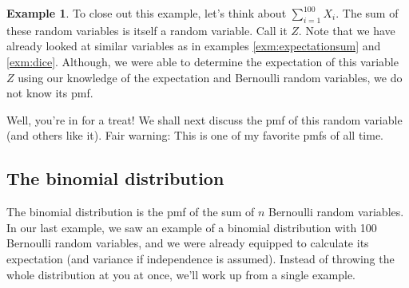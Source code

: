 \documentclass[
]{book}
\theoremstyle{definition}
\theoremstyle{definition}
\newtheorem{example}{Example}[chapter]
\theoremstyle{definition}
\theoremstyle{definition}
\theoremstyle{remark}
\begin{document}
\begin{example}
To close out this example, let's think about \(\sum_{i=1}^{100} X_i\). The sum of these random variables is itself a random variable. Call it \(Z\). Note that we have already looked at similar variables as in examples \ref{exm:expectationsum} and \ref{exm:dice}. Although, we were able to determine the expectation of this variable \(Z\) using our knowledge of the expectation and Bernoulli random variables, we do not know its pmf.

Well, you're in for a treat! We shall next discuss the pmf of this random variable (and others like it). Fair warning: This is one of my favorite pmfs of all time.
\end{example}

\subsection{The binomial distribution}\label{the-binomial-distribution}

The binomial distribution is the pmf of the sum of \(n\) Bernoulli random variables. In our last example, we saw an example of a binomial distribution with 100 Bernoulli random variables, and we were already equipped to calculate its expectation (and variance if independence is assumed). Instead of throwing the whole distribution at you at once, we'll work up from a single example.
\end{document}
